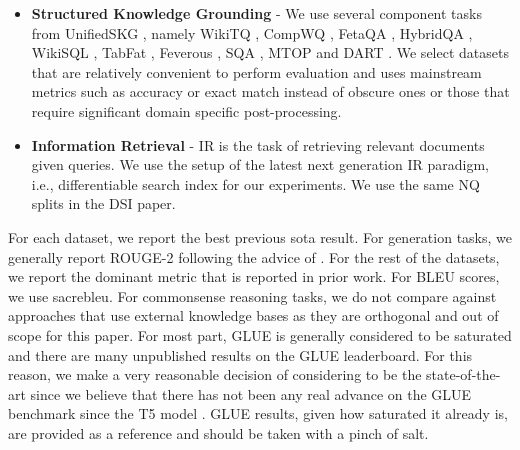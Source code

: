 \documentclass[10pt]{article}
\begin{document}
\begin{itemize}
    \item \textbf{Structured Knowledge Grounding} - We use several component tasks from UnifiedSKG \citep{xie2022unifiedskg}, namely WikiTQ \citep{pasupat2015compositional}, CompWQ \citep{talmor2018web}, FetaQA \citep{nan2021fetaqa}, HybridQA \citep{chen2020hybridqa}, WikiSQL \citep{zhongSeq2SQL2017}, TabFat \citep{chen2019tabfact}, Feverous \citep{aly-etal-2021-fact}, SQA \citep{iyyer2017search},  MTOP \citep{li2020mtop} and DART \citep{nan2020dart}. We select datasets that are relatively convenient to perform evaluation and uses mainstream metrics such as accuracy or exact match instead of obscure ones or those that require significant domain specific post-processing. 
    \item \textbf{Information Retrieval} - IR is the task of retrieving relevant documents given queries. We use the setup of the latest next generation IR paradigm, i.e., differentiable search index \citep{tay2022transformer} for our experiments. We use the same NQ \citep{Kwiatkowski2019naturalquestions} splits in the DSI paper.
\end{itemize}
For each dataset, we report the best previous sota result. For generation tasks, we generally report ROUGE-2 following the advice of \citep{gehrmann2022repairing}. For the rest of the datasets, we report the dominant metric that is reported in prior work. For BLEU scores, we use sacrebleu. For commonsense reasoning tasks, we do not compare against approaches that use external knowledge bases as they are orthogonal and out of scope for this paper. For most part, GLUE is generally considered to be saturated and there are many unpublished results on the GLUE leaderboard. For this reason, we make a very reasonable decision of considering \citep{raffel2019exploring} to be the state-of-the-art since we believe that there has not been any real advance on the GLUE benchmark since the T5 model \citep{raffel2019exploring}. GLUE results, given how saturated it already is, are provided as a reference and should be taken with a pinch of salt. 
\end{document}
